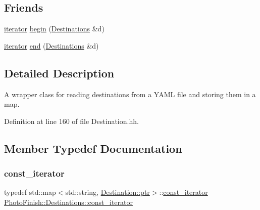 \subsection*{Friends}
\begin{DoxyCompactItemize}
\item 
\hyperlink{class_photo_finish_1_1_destinations_adb2cf9240b0d2545643caa2c1d718913}{iterator} \hyperlink{class_photo_finish_1_1_destinations_ade7fb31c8d1fba6dee62f77783fe6236}{begin} (\hyperlink{class_photo_finish_1_1_destinations}{Destinations} \&d)
\item 
\hyperlink{class_photo_finish_1_1_destinations_adb2cf9240b0d2545643caa2c1d718913}{iterator} \hyperlink{class_photo_finish_1_1_destinations_aa5c17bba7272204d0d3ae7a116feaec2}{end} (\hyperlink{class_photo_finish_1_1_destinations}{Destinations} \&d)
\end{DoxyCompactItemize}


\subsection{Detailed Description}
A wrapper class for reading destinations from a Y\+A\+ML file and storing them in a map. 

Definition at line 160 of file Destination.\+hh.



\subsection{Member Typedef Documentation}
\mbox{\label{class_photo_finish_1_1_destinations_a267e114a259d98ae440074660c7086cb}} 
\subsubsection{\texorpdfstring{const\+\_\+iterator}{const\_iterator}}
{\footnotesize\ttfamily typedef std\+::map$<$std\+::string, \hyperlink{class_photo_finish_1_1_destination_a0d282a905cd81c3f0e6d7233c9bc7774}{Destination\+::ptr}$>$\+::\hyperlink{class_photo_finish_1_1_destinations_a267e114a259d98ae440074660c7086cb}{const\+\_\+iterator} \hyperlink{class_photo_finish_1_1_destinations_a267e114a259d98ae440074660c7086cb}{Photo\+Finish\+::\+Destinations\+::const\+\_\+iterator}}



